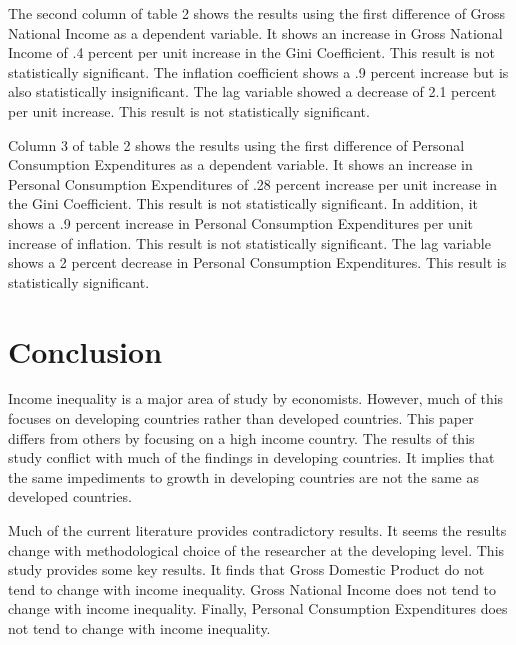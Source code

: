 \documentclass{article}
\begin{document}
\vspace{2mm}

\quad The second column of table 2 shows the results using the first difference of Gross National Income as a dependent variable.  It shows an increase in Gross National Income of .4 percent per unit increase in the Gini Coefficient.  This result is not statistically significant.  The inflation coefficient shows a .9 percent increase but is also statistically insignificant.  The lag variable showed a decrease of 2.1 percent per unit increase.  This result is not statistically significant.  

\vspace{2mm}

\quad Column 3 of table 2 shows the results using the first difference of Personal Consumption Expenditures as a dependent variable.  It  shows an increase in Personal Consumption Expenditures of .28 percent increase per unit increase in the Gini Coefficient.  This result is not statistically significant.  In addition, it shows a .9 percent increase in Personal Consumption Expenditures per unit increase of inflation.  This result is not statistically significant.  The lag variable shows a 2 percent decrease in Personal Consumption Expenditures.  This result is statistically significant.  

\vspace{2mm}

\section{Conclusion}

\quad Income inequality is a major area of study by economists.  However, much of this focuses on developing countries rather than developed countries. This paper differs from others by focusing on a high income country.  The results of this study conflict with much of the findings in developing countries.  It implies that the same impediments to growth in developing countries are not the same as developed countries.   
\vspace{2mm}

\quad Much of the current literature provides contradictory results.  It seems the results change with methodological choice of the researcher at the developing level.  This study provides some key results.  It finds that Gross Domestic Product do not tend to change with income inequality.  Gross National Income does not tend to change with income inequality.  Finally, Personal Consumption Expenditures does not tend to change with income inequality.  
\vspace{2mm}
\end{document}
